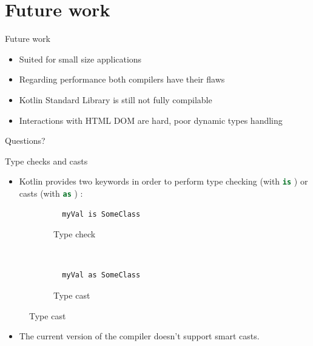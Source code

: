 \documentclass[10pt]{beamer}
\newcommand{\inlinecode}[2]{\colorbox{minted-bg}{\lstinline[language=#1]$#2$}}
\newcommand{\ktinline}[1]{\inlinecode{kotlin}{#1}}
\begin{document}
\section{Future work}

\begin{frame}{Future work}
 \begin{itemize}
  \item Suited for small size applications
  \item Regarding performance both compilers have their flaws
  \item Kotlin Standard Library is still not fully compilable
  \item Interactions with HTML DOM are hard, poor dynamic types handling
 \end{itemize}

\end{frame}



\begin{frame}[standout]
  Questions?
\end{frame}

\appendix


\begin{frame}[fragile]{Type checks and casts}
 \begin{itemize}
  \item Kotlin provides two keywords in order to perform type checking (with \ktinline{is} ) or casts (with \ktinline{as} ) :
 \end{itemize}
 
  \begin{figure}
   \centering
   \begin{subfigure}[h]{0.45\textwidth}
      \begin{verbatim}
  myVal is SomeClass
      \end{verbatim}
      \caption*{Type check}
   \end{subfigure}
   ~
   \begin{subfigure}[h]{0.45\textwidth}
      \begin{verbatim}
  myVal as SomeClass
      \end{verbatim}
      \caption*{Type cast}
   \end{subfigure}

  \end{figure}
  \begin{itemize}
   \item The current version of the compiler doesn't support smart casts.
  \end{itemize}

\end{frame}
\end{document}
